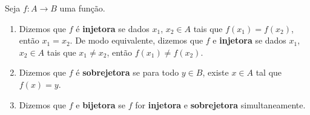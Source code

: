 \begin{definicao}
    Seja $f : A \to B$ uma função.
    \begin{enumerate}[label={\roman*})]
        \item Dizemos que $f$ é \textbf{injetora} se dados $x_1$, $x_2 \in A$ tais que $f(x_1) = f(x_2)$, então $x_1 = x_2$. De modo equivalente, dizemos que $f$ e \textbf{injetora} se dados $x_1$, $x_2 \in A$ tais que $x_1 \ne x_2$, então $f(x_1) \ne f(x_2)$.

        \item Dizemos que $f$ é \textbf{sobrejetora} se para todo $y \in B$, existe $x \in A$ tal que $f(x) = y$.

        \item Dizemos que $f$ e \textbf{bijetora} se $f$ for \textbf{injetora} e \textbf{sobrejetora} simultaneamente.
    \end{enumerate}
\end{definicao}

